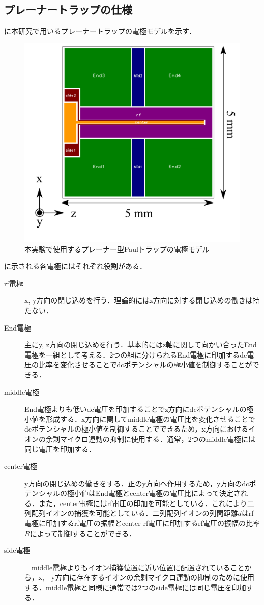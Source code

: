 \subsection{プレーナートラップの仕様}
に本研究で用いるプレーナートラップの電極モデルを示す．

\begin{figure}[h]
	\begin{center}
		\includegraphics[width = 0.5\linewidth]{./theory/figure/named_electrode.png}
		\caption{本実験で使用するプレーナー型Paulトラップの電極モデル}
		\label{fig:Named_PlanerTrap}
	\end{center}
\end{figure}

に示される各電極にはそれぞれ役割がある．
\begin{description}
\item[rf電極] x, y方向の閉じ込めを行う．理論的にはz方向に対する閉じ込めの働きは持たない．
\item[End電極] 主にy, z方向の閉じ込めを行う．基本的にはz軸に関して向かい合ったEnd電極を一組として考える．2つの組に分けられるEnd電極に印加するdc電圧の比率を変化させることでdcポテンシャルの極小値を制御することができる．
\item[middle電極] End電極よりも低いdc電圧を印加することでz方向にdcポテンシャルの極小値を形成する．x方向に関してmiddle電極の電圧比を変化させることでdcポテンシャルの極小値を制御することでできるため，x方向におけるイオンの余剰マイクロ運動の抑制に使用する．通常，2つのmiddle電極には同じ電圧を印加する．
\item[center電極] y方向の閉じ込めの働きをする．正のy方向へ作用するため，y方向のdcポテンシャルの極小値はEnd電極とcenter電極の電圧比によって決定される．また，center電極にはrf電圧の印加を可能としている．これにより二列配列イオンの捕獲を可能としている．二列配列イオンの列間距離$d$はrf電極に印加するrf電圧の振幅とcenter-rf電圧に印加するrf電圧の振幅の比率$R$によって制御することができる．
\item[side電極]　middle電極よりもイオン捕獲位置に近い位置に配置されていることから，x,　y方向に存在するイオンの余剰マイクロ運動の抑制のために使用する．middle電極と同様に通常では2つのside電極には同じ電圧を印加する．
\end{description}

